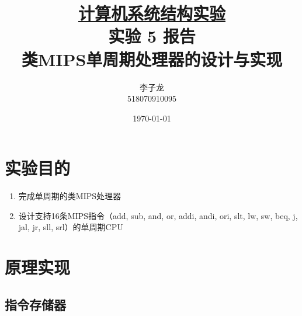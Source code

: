 \documentclass[a4paper,UTF8]{ctexart}
\begin{document}
\title{\normalsize \underline{计算机系统结构实验}\\\LARGE 实验 5 报告\\\vspace*{1em}\normalsize 类MIPS单周期处理器的设计与实现}
\author{李子龙\\ 518070910095}
\date{\today}
\maketitle
\tableofcontents
\clearpage

\section{实验目的}

\begin{enumerate}
    \item 完成单周期的类MIPS处理器
    \item 设计支持16条MIPS指令（add, sub, and, or, addi, andi, ori, slt, lw, sw, beq, j, jal, jr, sll, srl）的单周期CPU
\end{enumerate}

\section{原理实现}

\subsection{指令存储器}
\end{document}
